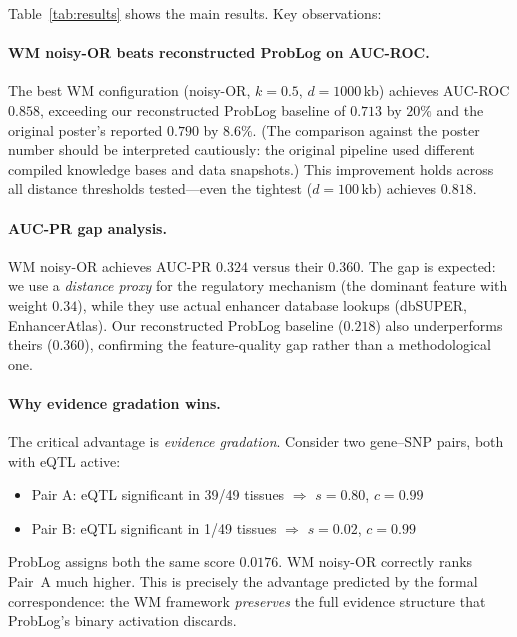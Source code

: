 \documentclass[]{article}
\begin{document}
Table~\ref{tab:results} shows the main results.  Key observations:

\paragraph{WM noisy-OR beats reconstructed ProbLog on AUC-ROC.}
The best WM configuration (noisy-OR, $k = 0.5$, $d = 1000$\,kb) achieves
AUC-ROC $0.858$, exceeding our reconstructed ProbLog baseline of $0.713$
by $20\%$ and the original poster's reported $0.790$ by $8.6\%$.
(The comparison against the poster number should be interpreted cautiously:
the original pipeline used different compiled knowledge bases and data
snapshots.)
This improvement holds across all distance thresholds tested---even the
tightest ($d = 100$\,kb) achieves $0.818$.

\paragraph{AUC-PR gap analysis.}
WM noisy-OR achieves AUC-PR $0.324$ versus their $0.360$.  The gap is expected:
we use a \emph{distance proxy} for the regulatory mechanism (the dominant
feature with weight $0.34$), while they use actual enhancer database lookups
(dbSUPER, EnhancerAtlas).  Our reconstructed ProbLog baseline ($0.218$) also
underperforms theirs ($0.360$), confirming the feature-quality gap rather than
a methodological one.

\paragraph{Why evidence gradation wins.}
The critical advantage is \emph{evidence gradation}.  Consider two gene--SNP
pairs, both with eQTL active:
\begin{itemize}
\item Pair A: eQTL significant in 39/49 tissues $\Rightarrow$ $s = 0.80$, $c = 0.99$
\item Pair B: eQTL significant in 1/49 tissues $\Rightarrow$ $s = 0.02$, $c = 0.99$
\end{itemize}
ProbLog assigns both the same score $0.0176$.  WM noisy-OR correctly ranks
Pair~A much higher.  This is precisely the advantage predicted by the formal
correspondence: the WM framework \emph{preserves} the full evidence structure
that ProbLog's binary activation discards.
\end{document}
